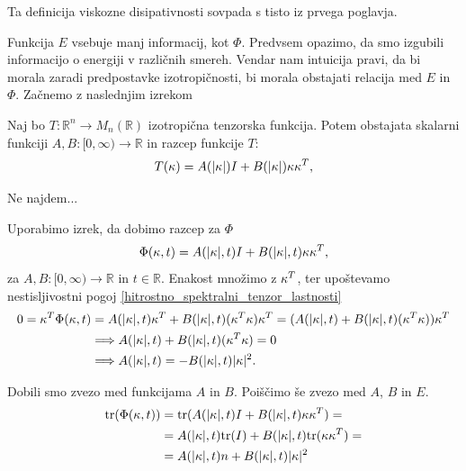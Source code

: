 \documentclass[mat2, tisk]{fmfdelo}
\newcommand{\R}{\mathbb R}
\newcommand{\bd}{\textbf}
\begin{document}
\begin{opomba}
Ta definicija viskozne disipativnosti sovpada s tisto iz 
prvega poglavja.
\end{opomba}

Funkcija $E$ vsebuje manj informacij, kot $\Phi$. Predvsem opazimo, 
da smo izgubili informacijo o energiji v različnih smereh. Vendar nam intuicija pravi, 
da bi morala zaradi predpostavke izotropičnosti, bi morala obstajati relacija med 
$E$ in $\Phi$. Začnemo z naslednjim izrekom 
\begin{izrek}
Naj bo $T: \R^n \rightarrow M_n(\R)$ izotropična tenzorska funkcija. 
Potem obstajata skalarni funkciji $A, B: [0, \infty) \rightarrow \R$ in razcep 
funkcije $T$: 
\begin{equation}
T(\text{\bd{$\kappa$}}) = A(|\text{\bd{$\kappa$}}|) I + B(|\text{\bd{$\kappa$}}|) \text{\bd{$\kappa$}} \text{\bd{$\kappa$}}^T,
\end{equation}
\end{izrek}

\begin{dokaz}
Ne najdem...
\end{dokaz}

Uporabimo izrek, da dobimo razcep za $\Phi$
\begin{equation}
\Phi(\text{\bd{$\kappa$}}, t) = A(|\text{\bd{$\kappa$}}|, t) I + B(|\text{\bd{$\kappa$}}|, t) \text{\bd{$\kappa$}} \text{\bd{$\kappa$}}^T,
\end{equation}
za $A, B: [0, \infty) \rightarrow \R$ in $t\in \R$. Enakost množimo z 
$\text{\bd{$\kappa$}}^T$, ter upoštevamo nestisljivostni pogoj \ref{hitrostno_spektralni_tenzor_lastnosti}
\begin{align*}
0 = \text{\bd{$\kappa$}}^T \Phi(\text{\bd{$\kappa$}}, t) &= A(|\text{\bd{$\kappa$}}|, t) \text{\bd{$\kappa$}}^T  + B(|\text{\bd{$\kappa$}}|, t) (\text{\bd{$\kappa$}}^T \text{\bd{$\kappa$}}) \text{\bd{$\kappa$}}^T = (A(|\text{\bd{$\kappa$}}|, t)  + B(|\text{\bd{$\kappa$}}|, t) (\text{\bd{$\kappa$}}^T \text{\bd{$\kappa$}})) \text{\bd{$\kappa$}}^T \\
&\Longrightarrow A(|\text{\bd{$\kappa$}}|, t)  + B(|\text{\bd{$\kappa$}}|, t) (\text{\bd{$\kappa$}}^T \text{\bd{$\kappa$}}) = 0 \\
&\Longrightarrow A(|\text{\bd{$\kappa$}}|, t) = -B(|\text{\bd{$\kappa$}}|, t) |\text{\bd{$\kappa$}}|^2.
\end{align*}

Dobili smo zvezo med funkcijama $A$ in $B$. Poiščimo še zvezo med 
$A$, $B$ in $E$. 
\begin{align*}
\text{tr}(\Phi(\text{\bd{$\kappa$}}, t)) &= \text{tr}(A(|\text{\bd{$\kappa$}}|, t) I + B(|\text{\bd{$\kappa$}}|, t) \text{\bd{$\kappa$}} \text{\bd{$\kappa$}}^T) = \\
&= A(|\text{\bd{$\kappa$}}|, t) \text{tr}(I) + B(|\text{\bd{$\kappa$}}|, t) \text{tr}(\text{\bd{$\kappa$}} \text{\bd{$\kappa$}}^T) = \\
&= A(|\text{\bd{$\kappa$}}|, t) n + B(|\text{\bd{$\kappa$}}|, t) |\text{\bd{$\kappa$}}|^2 
\end{align*}
\end{document}
